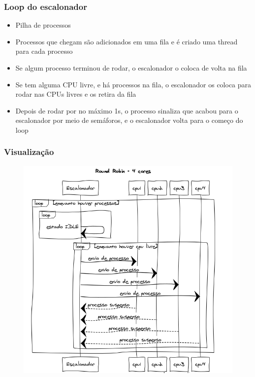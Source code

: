 \documentclass{beamer}
\begin{document}
\begin{frame}
\frametitle{Loop do escalonador}
\begin{itemize}
\item Pilha de processos
\item Processos que chegam são adicionados em uma fila e é criado uma thread para cada processo
\item Se algum processo terminou de rodar, o escalonador o coloca de volta na fila
\item Se tem alguma CPU livre, e há processos na fila, o escalonador os coloca para rodar nas CPUs livres e os retira da fila
\item Depois de rodar por no máximo 1s, o processo sinaliza que acabou para o escalonador por meio de semáforos, e o escalonador volta para o começo do loop
\end{itemize}
\end{frame}

\begin{frame}
\frametitle{Visualização}
\begin{figure}
\includegraphics[scale=0.32]{rr.png}
\end{figure}
\end{frame}
\end{document}
